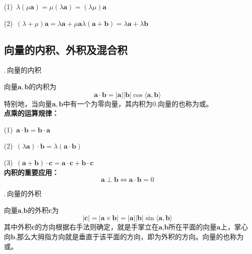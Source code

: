 (1)$\,$  \qquad
$\lambda(\mu\boldsymbol{a})=\mu(\lambda\boldsymbol{a})=(\lambda\mu)\boldsymbol{a}$

(2)$\,$  \qquad
$(\lambda+\mu)\boldsymbol{a}=\lambda\boldsymbol{a}+\mu \boldsymbol{a}$\qquad $\lambda(\boldsymbol{a}+\boldsymbol{b})=\lambda\boldsymbol{a}+\lambda\boldsymbol{b}$


\subsection{向量的内积、外积及混合积}
.$\,$向量的内积


向量$\boldsymbol{a},\boldsymbol{b}$的内积为
\begin{equation}
	\boldsymbol{a}\cdot\boldsymbol{b}=|\boldsymbol{a}||\boldsymbol{b}|\cos\langle\boldsymbol{a},\boldsymbol{b}\rangle
\end{equation}
特别地，当向量$\boldsymbol{a},\boldsymbol{b}$中有一个为零向量，其内积为0.向量的也称为或。\\
\textbf{点乘的运算规律：}

(1)$\,$ \qquad $\boldsymbol{a}\cdot\boldsymbol{b}=\boldsymbol{b}\cdot\boldsymbol{a}$

(2)$\,$ \qquad
$(\lambda\boldsymbol{a})\cdot\boldsymbol{b}=\lambda(\boldsymbol{a}\cdot\boldsymbol{b})$

(3)$\,$ \qquad
$(\boldsymbol{a}+\boldsymbol{b})\cdot\boldsymbol{c}=\boldsymbol{a}\cdot\boldsymbol{c}+\boldsymbol{b}\cdot\boldsymbol{c}$\\[0.5em]
\textbf{内积的重要应用：}
\begin{equation}
	\boldsymbol{a}\perp\boldsymbol{b}\Leftrightarrow \boldsymbol{a}\cdot\boldsymbol{b}=0 
\end{equation}

.$\,$向量的外积

向量$\boldsymbol{a}$,$\boldsymbol{b}$的外积$\boldsymbol{c}$为
\begin{equation}
	|\boldsymbol{c}|=|\boldsymbol{a}\times\boldsymbol{b}|=|\boldsymbol{a}||\boldsymbol{b}|\sin\langle\boldsymbol{a},\boldsymbol{b}\rangle
\end{equation}
其中外积$\boldsymbol{c}$的方向根据右手法则确定，就是手掌立在$\boldsymbol{a}$,$\boldsymbol{b}$所在平面的向量$\boldsymbol{a}$上，掌心向$\boldsymbol{b}$,那么大拇指方向就是垂直于该平面的方向，即为外积的方向。向量的也称为或。\\

